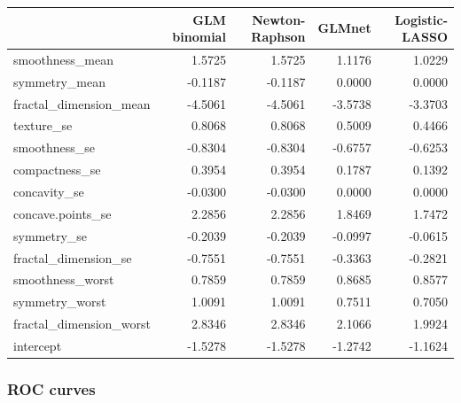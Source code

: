 \documentclass[]{article}
\newenvironment{Shaded}{\begin{snugshade}}{\end{snugshade}}
\newcommand{\DataTypeTok}[1]{\textcolor[rgb]{0.13,0.29,0.53}{#1}}
\newcommand{\DecValTok}[1]{\textcolor[rgb]{0.00,0.00,0.81}{#1}}
\newcommand{\KeywordTok}[1]{\textcolor[rgb]{0.13,0.29,0.53}{\textbf{#1}}}
\newcommand{\NormalTok}[1]{#1}
\newcommand{\OperatorTok}[1]{\textcolor[rgb]{0.81,0.36,0.00}{\textbf{#1}}}
\newcommand{\OtherTok}[1]{\textcolor[rgb]{0.56,0.35,0.01}{#1}}
\newcommand{\StringTok}[1]{\textcolor[rgb]{0.31,0.60,0.02}{#1}}
\begin{document}
\begin{Shaded}
\end{Shaded}

\begin{longtable}[]{@{}lrrrr@{}}
\toprule
& GLM binomial & Newton-Raphson & GLMnet & Logistic-LASSO\tabularnewline
\midrule
\endhead
smoothness\_mean & 1.5725 & 1.5725 & 1.1176 & 1.0229\tabularnewline
symmetry\_mean & -0.1187 & -0.1187 & 0.0000 & 0.0000\tabularnewline
fractal\_dimension\_mean & -4.5061 & -4.5061 & -3.5738 &
-3.3703\tabularnewline
texture\_se & 0.8068 & 0.8068 & 0.5009 & 0.4466\tabularnewline
smoothness\_se & -0.8304 & -0.8304 & -0.6757 & -0.6253\tabularnewline
compactness\_se & 0.3954 & 0.3954 & 0.1787 & 0.1392\tabularnewline
concavity\_se & -0.0300 & -0.0300 & 0.0000 & 0.0000\tabularnewline
concave.points\_se & 2.2856 & 2.2856 & 1.8469 & 1.7472\tabularnewline
symmetry\_se & -0.2039 & -0.2039 & -0.0997 & -0.0615\tabularnewline
fractal\_dimension\_se & -0.7551 & -0.7551 & -0.3363 &
-0.2821\tabularnewline
smoothness\_worst & 0.7859 & 0.7859 & 0.8685 & 0.8577\tabularnewline
symmetry\_worst & 1.0091 & 1.0091 & 0.7511 & 0.7050\tabularnewline
fractal\_dimension\_worst & 2.8346 & 2.8346 & 2.1066 &
1.9924\tabularnewline
intercept & -1.5278 & -1.5278 & -1.2742 & -1.1624\tabularnewline
\bottomrule
\end{longtable}

\hypertarget{roc-curves}{%
\subsubsection{ROC curves}\label{roc-curves}}

\begin{Shaded}
\end{Shaded}
\end{document}

